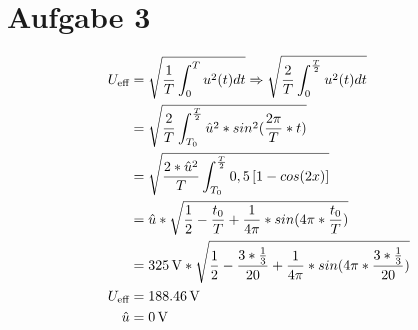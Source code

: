 \documentclass[../../document.tex]{subfiles}
\begin{document}
\section*{Aufgabe 3}

\begin{equation*}
    \begin{split}
        U_{\textrm{eff}} &= \sqrt{\frac{1}{T} \int_{0}^{T} u^2 (t) dt} \Rightarrow \sqrt{\frac{2}{T} \int_{0}^{\frac{T}{2}} u^2 (t) dt}\\
        &= \sqrt{\frac{2}{T} \int_{T_{\textrm{0}}}^{\frac{T}{2}} \hat{u}^2 * sin^2 (\frac{2 \pi}{T} * t)} \\
        &= \sqrt{\frac{2 * \hat{u}^2}{T} \int_{T_{\textrm{0}}}^{\frac{T}{2}} 0,5 \left[ 1 - cos (2x) \right] } \\
        &= \hat{u} * \sqrt{\frac{1}{2} - \frac{t_{\textrm{0}}}{T} + \frac{1}{4 \pi} * sin (4 \pi * \frac{t_{\textrm{0}}}{T})}\\
        &= \SI{325}{\volt} * \sqrt{\frac{1}{2} - \frac{3 * \frac{1}{3}}{20} + \frac{1}{4 \pi} * sin (4 \pi * \frac{3 * \frac{1}{3}}{20})}\\
        U_{\textrm{eff}} &= \SI{188,46}{\volt}\\
        \hat{u} &= \SI{0}{\volt}\\
    \end{split}
\end{equation*}
\end{document}
